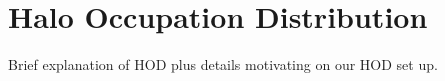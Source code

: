 \section{Halo Occupation Distribution} \label{sec:hod}  
Brief explanation of HOD plus details motivating on our HOD set up.

